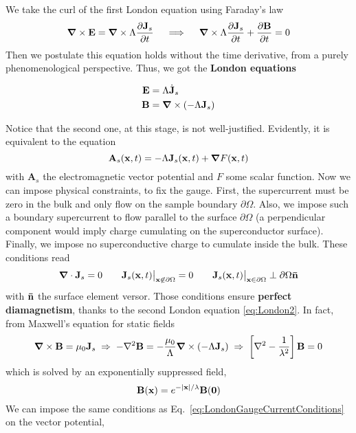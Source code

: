 We take the curl of the first London equation using Faraday's law
\[
    \grad\times\mathbf{E} = \grad\times \Lambda \pdv{{\mathbf{J}}_s}{t}
    \quad\implies\quad
    \grad \times \Lambda \pdv{\mathbf{J
    }_s}{t} + \pdv{\mathbf{B}}{t} = 0 
\]
Then we postulate this equation holds without the time derivative, from a purely phenomenological perspective. Thus, we got the \textbf{London equations}
\begin{eqbox}
    \vspace{-0.4em}
    \begin{align}
        \mathbf{E} &= \Lambda \dot{\mathbf{J}}_s \label{eq:London1} \\
        \mathbf{B} &= \grad\times\left({-\Lambda\mathbf{J}_s}\right) \label{eq:London2}
    \end{align}
\end{eqbox}
Notice that the second one, at this stage, is not well-justified. Evidently, it is equivalent to the equation
\[ 
    \mathbf{A}_s (\mathbf{x},t) = - \Lambda \mathbf{J}_s (\mathbf{x},t) + \grad F(\mathbf{x},t)
\]
with $\mathbf{A}_s$ the electromagnetic vector potential and $F$ some scalar function. Now we can impose physical constraints, to fix the gauge. First, the supercurrent must be zero in the bulk and only flow on the sample boundary $\partial\Omega$. Also, we impose such a boundary supercurrent to flow parallel to the surface $\partial\Omega$ (a perpendicular component would imply charge cumulating on the superconductor surface). Finally, we impose no superconductive charge to cumulate inside the bulk. These conditions read
\begin{equation}\label{eq:LondonGaugeCurrentConditions}
    \grad\cdot\mathbf{J}_s = 0
    \qquad
    \mathbf{J}_s(\mathbf{x},t) \big|_{\mathbf{x}\not\in\partial\Omega} = 0
    \qquad
    \mathbf{J}_s(\mathbf{x},t) \big|_{\mathbf{x}\in\partial\Omega} \perp \partial\Omega \mathbf{\bar{n}}
\end{equation}
with $\mathbf{\bar{n}}$ the surface element versor. Those conditions ensure \textbf{perfect diamagnetism}, thanks to the second London equation \eqref{eq:London2}. In fact, from Maxwell's equation for static fields
\[
    \grad\times\mathbf{B} = \mu_0 \mathbf{J}_s
    \;\Rightarrow\;
    -\laplacian\mathbf{B} = -\frac{\mu_0}{\Lambda} \grad\times\lrR{-\Lambda\mathbf{J}_s}
    \;\Rightarrow\;
    \lrS{\laplacian - \frac{1}{\lambda^2}}\mathbf{B}=0
\]
which is solved by an exponentially suppressed field,
\[
    \mathbf{B}(\mathbf{x}) = e^{-\abs{\mathbf{x}}/\lambda} \mathbf{B(\mathbf{0})}
\]
We can impose the same conditions as Eq.~\eqref{eq:LondonGaugeCurrentConditions} on the vector potential,
